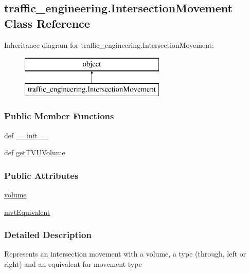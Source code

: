 \hypertarget{classtraffic__engineering_1_1IntersectionMovement}{\subsection{traffic\-\_\-engineering.\-Intersection\-Movement Class Reference}
\label{classtraffic__engineering_1_1IntersectionMovement}
}
Inheritance diagram for traffic\-\_\-engineering.\-Intersection\-Movement\-:\begin{figure}[H]
\begin{center}
\leavevmode
\includegraphics[height=2.000000cm]{classtraffic__engineering_1_1IntersectionMovement}
\end{center}
\end{figure}
\subsubsection*{Public Member Functions}
\begin{DoxyCompactItemize}
\item 
def \hyperlink{classtraffic__engineering_1_1IntersectionMovement_ae0d301b7637ad25e77683b637502d08a}{\-\_\-\-\_\-init\-\_\-\-\_\-}
\item 
def \hyperlink{classtraffic__engineering_1_1IntersectionMovement_afa688045995b9833ec1b7c5dbbc09de3}{get\-T\-V\-U\-Volume}
\end{DoxyCompactItemize}
\subsubsection*{Public Attributes}
\begin{DoxyCompactItemize}
\item 
\hyperlink{classtraffic__engineering_1_1IntersectionMovement_a57c9f52a7252a30f9e7859e8bcb8006c}{volume}
\item 
\hyperlink{classtraffic__engineering_1_1IntersectionMovement_acddb31d7563b35067734ae07faa10de0}{mvt\-Equivalent}
\end{DoxyCompactItemize}


\subsubsection{Detailed Description}
\begin{DoxyVerb}Represents an intersection movement
with a volume, a type (through, left or right)
and an equivalent for movement type\end{DoxyVerb}
 

